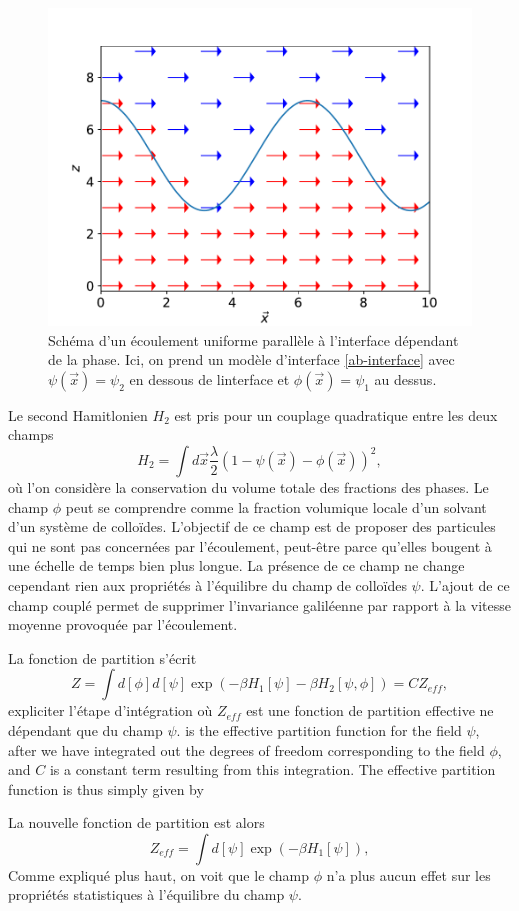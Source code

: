 \begin{figure}
    \centering
    \includegraphics[width=0.5\linewidth]{pop/ab-phi.pdf}
    \caption{Schéma d'un écoulement uniforme parallèle à l'interface dépendant de la phase. Ici, on prend un modèle d'interface \ref{ab-interface} avec $\psi(\vec{x})=\psi_2$ en dessous de linterface et $\phi(\vec{x})=\psi_1$ au dessus. }
\end{figure}

Le second Hamitlonien $H_2$ est pris pour un couplage quadratique entre les deux champs
\begin{equation}
H_2 =\int d\vec{x} \frac{\lambda}{2}(1-\psi(\vec{x})-\phi(\vec{x}))^2,
\end{equation}
où l'on considère la conservation du volume totale des fractions des phases. Le champ $\phi$ peut se comprendre comme la fraction volumique locale d'un solvant d'un système de colloïdes. L'objectif de ce champ est de proposer des particules qui ne sont pas concernées par l'écoulement, peut-être parce qu'elles bougent à une échelle de temps bien plus longue. La présence de ce champ ne change cependant rien aux propriétés à l'équilibre du champ de colloïdes $\psi$. 
L'ajout de ce champ couplé permet de supprimer l'invariance galiléenne par rapport à la vitesse moyenne provoquée par l'écoulement. 

La fonction de partition s'écrit 
\begin{equation}
Z = \int d[\phi]d[\psi]\exp(-\beta H_1[\psi]- \beta H_2[\psi,\phi]) = CZ_{eff},
\end{equation}
{\color{red} expliciter l'étape d'intégration}
où $Z_{eff}$ est une fonction de partition effective ne dépendant que du champ $\psi$.
is the effective partition function for the field $\psi$, after we have integrated out the degrees of freedom corresponding to the field $\phi$,
and $C$ is a constant term resulting from this integration. The effective partition function is thus simply given by

La nouvelle fonction de partition est alors 
\begin{equation}
    Z_{eff} = \int d[\psi]\exp(-\beta H_1[\psi]),
\end{equation}
Comme expliqué plus haut, on voit que le champ $\phi$ n'a plus aucun effet sur les propriétés statistiques à l'équilibre du champ $\psi$.


